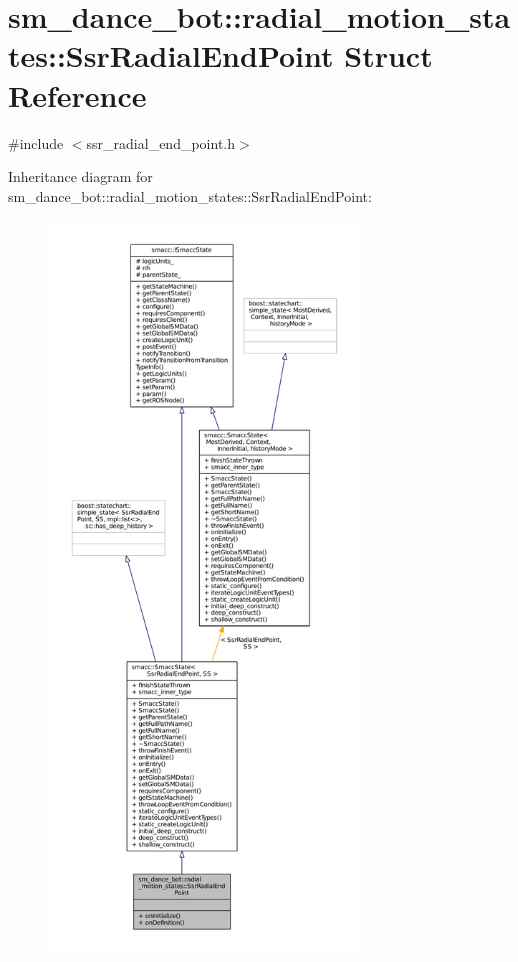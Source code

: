 \hypertarget{structsm__dance__bot_1_1radial__motion__states_1_1SsrRadialEndPoint}{}\section{sm\+\_\+dance\+\_\+bot\+:\+:radial\+\_\+motion\+\_\+states\+:\+:Ssr\+Radial\+End\+Point Struct Reference}
\label{structsm__dance__bot_1_1radial__motion__states_1_1SsrRadialEndPoint}


{\ttfamily \#include $<$ssr\+\_\+radial\+\_\+end\+\_\+point.\+h$>$}



Inheritance diagram for sm\+\_\+dance\+\_\+bot\+:\+:radial\+\_\+motion\+\_\+states\+:\+:Ssr\+Radial\+End\+Point\+:
\nopagebreak
\begin{figure}[H]
\begin{center}
\leavevmode
\includegraphics[height=550pt]{structsm__dance__bot_1_1radial__motion__states_1_1SsrRadialEndPoint__inherit__graph}
\end{center}
\end{figure}


